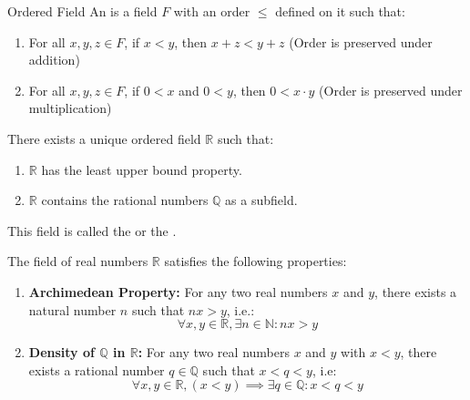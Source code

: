 \documentclass[openany]{book}
\begin{document}
\begin{mydefinition}{Ordered Field}
    An  is a field $F$ with an order $\leq$ defined on it such that:
    \begin{enumerate}
        \item For all $x, y, z \in F$, if $x < y$, then $x + z < y + z$ (Order is preserved under addition)
        \item For all $x, y, z \in F$, if $0 < x$ and $0 < y$, then $0 < x \cdot y$ (Order is preserved under multiplication)
    \end{enumerate}
\end{mydefinition}
\begin{mytheorem}
    There exists a unique ordered field $\mathbb{R}$ such that:
    \begin{enumerate}
        \item $\mathbb{R}$ has the least upper bound property.
        \item $\mathbb{R}$ contains the rational numbers $\mathbb{Q}$ as a subfield.
    \end{enumerate}
    This field is called the  or the .
\end{mytheorem}
\begin{mytheorem}
    The field of real numbers $\mathbb{R}$ satisfies the following properties:
    \begin{enumerate}
        \item \textbf{Archimedean Property:} For any two real numbers $x$ and $y$, there exists a natural number $n$ such that $nx>y$, i.e.:
        $$\forall x, y \in \mathbb{R}, \exists n \in \mathbb{N}: nx >y$$
        \item \textbf{Density of $\mathbb{Q}$ in $\mathbb{R}$:} For any two real numbers $x$ and $y$ with $x < y$, there exists a rational number $q \in \mathbb{Q}$ such that $x < q < y$, i.e: 
        $$\forall x, y \in \mathbb{R}, (x < y) \implies \exists q \in \mathbb{Q}: x < q < y$$
    \end{enumerate}
    
\end{mytheorem}
\end{document}
